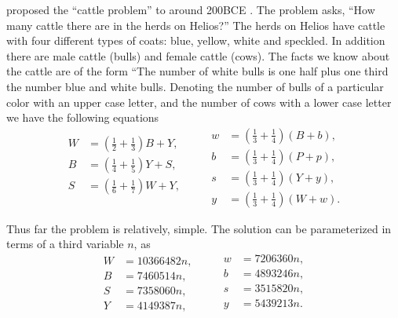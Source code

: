  proposed the ``cattle
problem'' to 
around 200BCE \cite[pp. 202--205]{Bulmer-Thomas1951-yt}.  The problem asks, ``How
many cattle there are in the herds on Helios?''  The herds on Helios
have cattle with four different types of coats: blue, yellow,
white and speckled.  In addition there are male cattle (bulls) and
female cattle (cows).  The facts we know about the cattle are of the
form ``The number of white bulls is one half plus one third the number
blue and white bulls.  Denoting the number of bulls of a particular
color with an upper case letter, and the number of cows with a lower
case letter we have the following equations
\[
\begin{aligned}
  W &= \left(\frac{1}{2} + \frac{1}{3}\right) B + Y, \\
  B &= \left(\frac{1}{4} + \frac{1}{5}\right) Y + S, \\
  S &= \left(\frac{1}{6} + \frac{1}{7}\right) W + Y, \\
\end{aligned}
\qquad
\begin {aligned}
  w &= \left(\frac{1}{3} + \frac{1}{4}\right) (B + b), \\
  b &= \left(\frac{1}{3} + \frac{1}{4}\right) (P + p), \\
  s &= \left(\frac{1}{3} + \frac{1}{4}\right) (Y + y), \\
  y &= \left(\frac{1}{3} + \frac{1}{4}\right) (W + w). 
\end{aligned}
\]

Thus far the problem is relatively, simple.  The solution can be
parameterized in terms of a third variable $n$, as
\[
\begin{aligned}
  W &= 10366482 n, \\
  B &= 7460514n, \\
  S &= 7358060n, \\
  Y &= 4149387n,
\end{aligned}
\qquad
\begin {aligned}
  w &= 7206360n, \\
  b &= 4893246n, \\
  s &= 3515820n, \\
  y &= 5439213n. \\
\end{aligned}
\]

